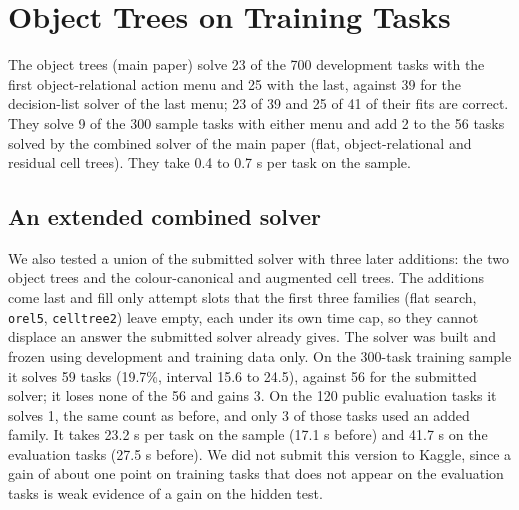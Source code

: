 \documentclass[sigconf,nonacm]{acmart}
\begin{document}
\section{Object Trees on Training Tasks}

The object trees (main paper) solve 23 of the 700 development tasks with the first object-relational action menu and 25 with the last, against 39 for the decision-list solver of the last menu; 23 of 39 and 25 of 41 of their fits are correct. They solve 9 of the 300 sample tasks with either menu and add 2 to the 56 tasks solved by the combined solver of the main paper (flat, object-relational and residual cell trees). They take 0.4 to 0.7 s per task on the sample.

\subsection{An extended combined solver}\label{sec:ext}

We also tested a union of the submitted solver with three later additions: the two object trees and the colour-canonical and augmented cell trees. The additions come last and fill only attempt slots that the first three families (flat search, \texttt{orel5}, \texttt{celltree2}) leave empty, each under its own time cap, so they cannot displace an answer the submitted solver already gives. The solver was built and frozen using development and training data only. On the 300-task training sample it solves 59 tasks (19.7\%, interval 15.6 to 24.5), against 56 for the submitted solver; it loses none of the 56 and gains 3. On the 120 public evaluation tasks it solves 1, the same count as before, and only 3 of those tasks used an added family. It takes 23.2 s per task on the sample (17.1 s before) and 41.7 s on the evaluation tasks (27.5 s before). We did not submit this version to Kaggle, since a gain of about one point on training tasks that does not appear on the evaluation tasks is weak evidence of a gain on the hidden test.



\end{document}
